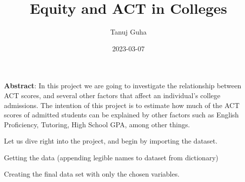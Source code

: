 \documentclass[
]{article}
\title{Equity and ACT in Colleges}
\author{Tanuj Guha}
\date{2023-03-07}
\newenvironment{Shaded}{\begin{snugshade}}{\end{snugshade}}
\newcommand{\AttributeTok}[1]{\textcolor[rgb]{0.77,0.63,0.00}{#1}}
\newcommand{\CommentTok}[1]{\textcolor[rgb]{0.56,0.35,0.01}{\textit{#1}}}
\newcommand{\ConstantTok}[1]{\textcolor[rgb]{0.00,0.00,0.00}{#1}}
\newcommand{\DecValTok}[1]{\textcolor[rgb]{0.00,0.00,0.81}{#1}}
\newcommand{\FunctionTok}[1]{\textcolor[rgb]{0.00,0.00,0.00}{#1}}
\newcommand{\NormalTok}[1]{#1}
\newcommand{\OtherTok}[1]{\textcolor[rgb]{0.56,0.35,0.01}{#1}}
\newcommand{\SpecialCharTok}[1]{\textcolor[rgb]{0.00,0.00,0.00}{#1}}
\newcommand{\StringTok}[1]{\textcolor[rgb]{0.31,0.60,0.02}{#1}}
\begin{document}
\maketitle

\textbf{Abstract}: In this project we are going to investigate the
relationship between ACT scores, and several other factors that affect
an individual's college admissions. The intention of this project is to
estimate how much of the ACT scores of admitted students can be
explained by other factors such as English Proficiency, Tutoring, High
School GPA, among other things.

Let us dive right into the project, and begin by importing the dataset.

Getting the data (appending legible names to dataset from dictionary)

\begin{Shaded}
\end{Shaded}

Creating the final data set with only the chosen variables.
\end{document}
